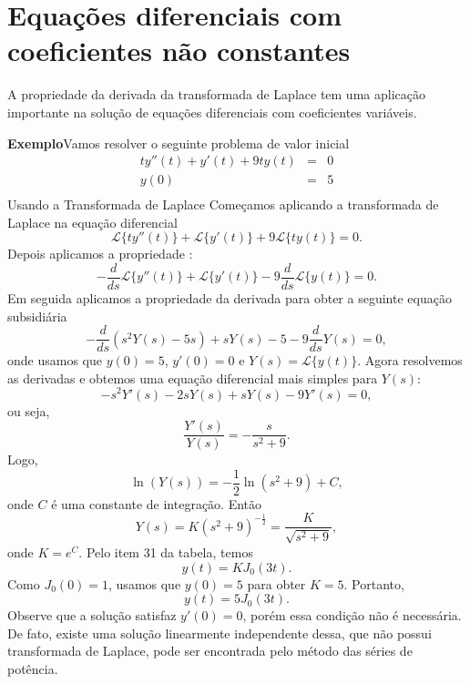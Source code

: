\documentclass[a4paper,10pt]{book}
\begin{document}
 
 
 \section{Equações diferenciais com coeficientes não constantes}
 A propriedade  da derivada da transformada de Laplace tem uma aplicação importante na solução de equações diferenciais com coeficientes variáveis.

 {\bf Exemplo}Vamos resolver o seguinte problema de valor inicial
 \begin{eqnarray*}
 ty''(t)+y'(t)+9ty(t)&=&0\\
 y(0)&=&5\\
 \end{eqnarray*}
Usando a  Transformada de Laplace
  Começamos aplicando a transformada de Laplace na equação diferencial
 \begin{equation}
 \mathcal{L}\{ty''(t)\}+\mathcal{L}\{y'(t)\}+9\mathcal{L}\{ty(t)\}=0.
 \end{equation}
 Depois aplicamos a propriedade :
 \begin{equation}
 -\frac{d}{ds}\mathcal{L}\{y''(t)\}+\mathcal{L}\{y'(t)\}-9\frac{d}{ds}\mathcal{L}\{y(t)\}=0.
 \end{equation}
  Em seguida aplicamos a propriedade da derivada para obter a seguinte equação subsidiária
 \begin{equation}
 -\frac{d}{ds}\left(s^2Y(s)-5s\right)+sY(s)-5-9\frac{d}{ds}Y(s)=0,
 \end{equation}
 onde usamos que $y(0)=5$, $y'(0)=0$ e $Y(s)=\mathcal{L}\{y(t)\}$. Agora resolvemos as derivadas e obtemos uma equação diferencial mais simples para $Y(s)$:
 \begin{equation}
 -s^2Y'(s)-2sY(s)+sY(s)-9Y'(s)=0,
 \end{equation}
 ou seja,
 \begin{equation}
 \frac{Y'(s)}{Y(s)}=-\frac{s}{s^2+9}.
 \end{equation}
 Logo,
 \begin{equation}
 \ln(Y(s))=-\frac{1}{2}\ln(s^2+9)+C,
 \end{equation}
 onde $C$ é uma constante de integração. Então
 \begin{equation}
 Y(s)=K(s^2+9)^{-\frac{1}{2}}=\frac{K}{\sqrt{s^2+9}},
 \end{equation}
 onde $K=e^{C}$. Pelo item 31 da tabela, temos
 \begin{equation}
 y(t)=KJ_0(3t).
 \end{equation}
 Como $J_0(0)=1$, usamos que $y(0)=5$ para obter $K=5$. Portanto,
 \begin{equation}
 y(t)=5J_0(3t).
 \end{equation}
 Observe que a solução satisfaz $y'(0)=0$, porém essa condição não é necessária. De fato, existe uma solução linearmente independente dessa, que não possui transformada de Laplace, pode ser encontrada pelo método das séries de potência.
\end{document}
